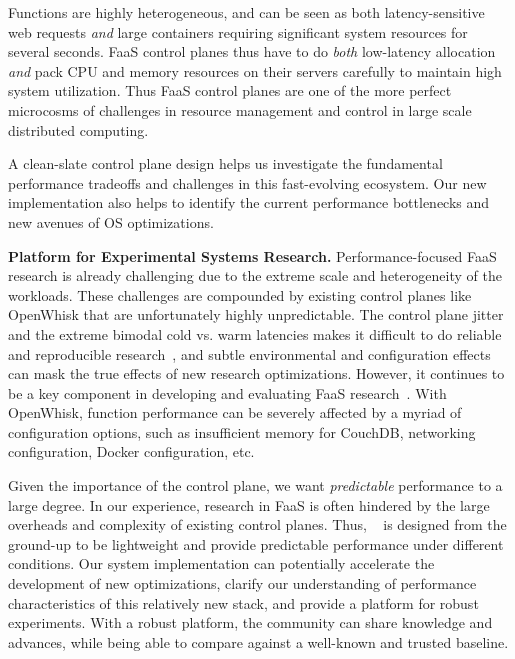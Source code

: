 Functions are highly heterogeneous, and can be seen as both latency-sensitive web requests \emph{and} large containers requiring significant system resources for several seconds. 
FaaS control planes thus have to do \emph{both} low-latency allocation \emph{and} pack CPU and memory resources on their servers carefully to maintain high system utilization.
%
Thus FaaS control planes are one of the more perfect microcosms of challenges in resource management and control in large scale distributed computing. 

A clean-slate control plane design helps us investigate the fundamental performance tradeoffs and challenges in this fast-evolving ecosystem.
Our new implementation also helps to identify the current performance bottlenecks and new avenues of OS optimizations. 


\noindent \textbf{Platform for Experimental Systems Research.}
%
Performance-focused FaaS research is already challenging due to the extreme scale and heterogeneity of the workloads.
These challenges are compounded by existing control planes like OpenWhisk that are unfortunately highly unpredictable.
The control plane jitter and the extreme bimodal cold vs. warm latencies makes it difficult to do reliable and reproducible research~\cite{mytkowicz2009producing}, and subtle environmental and configuration effects can mask the true effects of new research optimizations.
However, it continues to be a key component in developing and evaluating FaaS research~\cite{akkus_sand_2018, shahrad_serverless_2020, faascache-asplos21, faaslb-hpdc22, zhou2022aquatope, ensure-faas-acsos20, alzayat_groundhog_2022}. 
With OpenWhisk, function performance can be severely affected by a myriad of configuration options, such as insufficient memory for CouchDB, networking configuration, Docker configuration, etc. 

Given the importance of the control plane, we want \emph{predictable} performance to a large degree. 
In our experience, research in FaaS is often hindered by the large overheads and complexity of existing control planes. 
Thus, \sysname~ is designed from the ground-up to be lightweight and provide predictable performance under different conditions. 
Our system implementation can potentially accelerate the development of new optimizations, clarify  our understanding of performance characteristics of this relatively new stack, and provide a platform for robust experiments. 
With a robust platform, the community can share knowledge and advances, while being able to compare against a well-known and trusted baseline.


